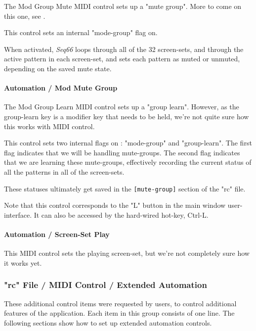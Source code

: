    The Mod Group Mute MIDI control sets up a "mute group".
   More to come on this one,
   see .

   This control sets an internal "mode-group" flag on.

   When activated, \textsl{Seq66} loops through all of the 32
   screen-sets, and through the active pattern in each screen-set, and
   sets each pattern as muted or unmuted, depending on the saved mute state.

\paragraph{Automation / Mod Mute Group}
\label{paragraph:seq66_rc_file_midi_ctrl_modgmute}

   The Mod Group Learn MIDI control sets up a "group learn".
   However, as the group-learn key is a modifier key that needs to
   be held, we're not quite sure how this works with MIDI control.

   This control sets two internal flags on : "mode-group" and "group-learn".
   The first flag indicates that we will be handling mute-groups.
   The second flag indicates that we are learning these mute-groups,
   effectively recording the current status of all the patterns in all of the
   screen-sets.

   These statuses ultimately get saved in the \texttt{[mute-group]} section of
   the "rc" file.

   Note that this control corresponds to the "L" button in the main window
   user-interface.
   It can also be accessed by the hard-wired hot-key, Ctrl-L.

\paragraph{Automation / Screen-Set Play}
\label{paragraph:seq66_rc_file_midi_ctrl_ssplay}

This MIDI control sets the playing screen-set, 
but we're not completely sure how it works yet.

\subsubsection{"rc" File / MIDI Control / Extended Automation}
\label{subsubsec:seq66_rc_file_midi_ctrl_automationex}

   These additional control items were requested by users, to control
   additional features of the application.
   Each item in this group consists of one line.
   The following sections show how to set up extended automation controls.

